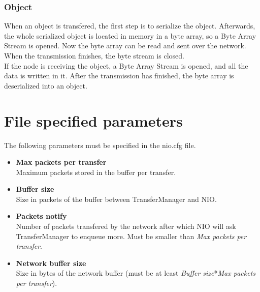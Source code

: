 \documentclass[11pt]{article}
\begin{document}
		\subsubsection{Object}
			When an object is transfered, the first step is to serialize the object. Afterwards, the whole serialized object is located in memory in a byte array, so a Byte Array Stream is opened. Now the byte array can be read and sent over the network. When the transmission finishes, the byte stream is closed.\\ If the node is receiving the object, a Byte Array Stream is opened, and all the data is written in it. After the transmission has finished, the byte array is deserialized into an object.
\section{File specified parameters}
	The following parameters must be specified in the nio.cfg file.
	\begin{itemize}
	\item \textbf{Max packets per transfer}\\ Maximum packets stored in the buffer per transfer.
	\item \textbf{Buffer size}\\ Size in packets of the buffer between TransferManager and NIO.
	\item \textbf{Packets notify}\\ Number of packets transfered by the network after which NIO will ask TransferManager to enqueue more. Must be smaller than \emph{Max packets per transfer}.
	\item \textbf{Network buffer size}\\ Size in bytes of the network buffer (must be at least \emph{Buffer size}*\emph{Max packets per transfer}).
	\end{itemize}
\end{document}
